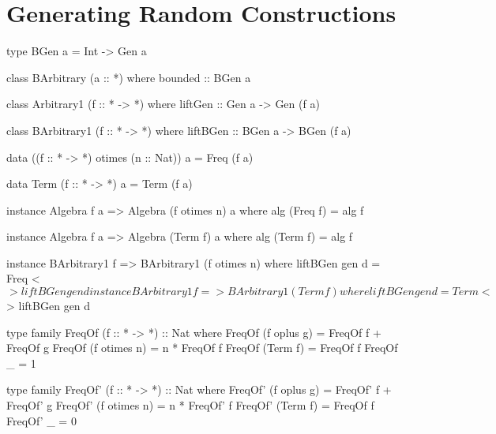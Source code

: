 \section{Generating Random Constructions}
\label{sec:generators}


\begin{code}
type BGen a = Int -> Gen a

class BArbitrary (a :: *) where
  bounded :: BGen a
\end{code}


\begin{code}
class Arbitrary1 (f :: * -> *) where
  liftGen :: Gen a -> Gen (f a)
\end{code}

\begin{code}
class BArbitrary1 (f :: * -> *) where
  liftBGen :: BGen a -> BGen (f a)
\end{code}

\begin{code}
data ((f :: * -> *) otimes (n :: Nat)) a = Freq (f a)
\end{code}

\begin{code}
data Term (f :: * -> *) a = Term (f a)
\end{code}

\begin{code}
instance Algebra f a => Algebra (f otimes n) a where
  alg (Freq f) = alg f
\end{code}

\begin{code}
instance Algebra f a => Algebra (Term f) a where
  alg (Term f) = alg f
\end{code}


\begin{code}
instance BArbitrary1 f => BArbitrary1 (f otimes n) where
  liftBGen gen d = Freq <$> liftBGen gen d

instance BArbitrary1 f => BArbitrary1 (Term f) where
  liftBGen gen d = Term <$> liftBGen gen d
\end{code}

\begin{code}
type family FreqOf (f :: * -> *) :: Nat where
  FreqOf (f oplus g)   = FreqOf f + FreqOf g
  FreqOf (f otimes n)  = n * FreqOf f
  FreqOf (Term f)      = FreqOf f
  FreqOf _             = 1
\end{code}

\begin{code}
type family FreqOf' (f :: * -> *) :: Nat where
  FreqOf' (f oplus g)   = FreqOf' f  +  FreqOf' g
  FreqOf' (f otimes n)  = n  *  FreqOf' f
  FreqOf' (Term f)      = FreqOf f
  FreqOf' _             = 0
\end{code}


